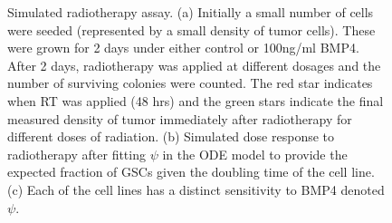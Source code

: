 \documentclass[
  default,
]{sn-jnl}
\begin{document}
\begin{figure}
\begin{minipage}{0.50\linewidth}
{}

\subcaption{\label{fig-sim_dose_response_GBM1a}}

\end{minipage}%
\newline
\begin{minipage}{\linewidth}


\subcaption{\label{fig-psi_values_visualised}}

\end{minipage}%

\caption{\label{fig-days_gained_example_sim}Simulated radiotherapy
assay. (a) Initially a small number of cells were seeded (represented by
a small density of tumor cells). These were grown for 2 days under
either control or 100ng/ml BMP4. After 2 days, radiotherapy was applied
at different dosages and the number of surviving colonies were counted.
The red star indicates when RT was applied (48 hrs) and the green stars
indicate the final measured density of tumor immediately after
radiotherapy for different doses of radiation. (b) Simulated dose
response to radiotherapy after fitting \(\psi\) in the ODE model to
provide the expected fraction of GSCs given the doubling time of the
cell line. (c) Each of the cell lines has a distinct sensitivity to BMP4
denoted \(\psi\).}

\end{figure}%
\end{document}
